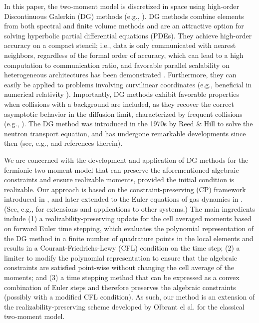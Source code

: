 In this paper, the two-moment model is discretized in space using high-order Discontinuous Galerkin (DG) methods (e.g., \cite{cockburnShu_2001,hesthavenWarburton_2008}).  
DG methods combine elements from both spectral and finite volume methods and are an attractive option for solving hyperbolic partial differential equations (PDEs).  
They achieve high-order accuracy on a compact stencil; i.e., data is only communicated with nearest neighbors, regardless of the formal order of accuracy, which can lead to a high computation to communication ratio, and favorable parallel scalability on heterogeneous architectures has been demonstrated \cite{klockner_etal_2009}.  
Furthermore, they can easily be applied to problems involving curvilinear coordinates (e.g., beneficial in numerical relativity \cite{teukolsky_2016}).  
Importantly, DG methods exhibit favorable properties when collisions with a background are included, as they recover the correct asymptotic behavior in the diffusion limit, characterized by frequent collisions (e.g., \cite{larsenMorel_1989,adams_2001,guermondKanschat_2010}).  
The DG method was introduced in the 1970s by Reed \& Hill \cite{reedHill_1973} to solve the neutron transport equation, and has undergone remarkable developments since then (see, e.g., \cite{shu_2016} and references therein).  

We are concerned with the development and application of DG methods for the fermionic two-moment model that can preserve the aforementioned algebraic constraints and ensure realizable moments, provided the initial condition is realizable.  
Our approach is based on the constraint-preserving (CP) framework introduced in \cite{zhangShu_2010a}, and later extended to the Euler equations of gas dynamics in \cite{zhangShu_2010b}.  
(See, e.g., \cite{xing_etal_2010,zhangShu_2011,olbrant_etal_2012,cheng_etal_2013,zhang_etal_2013,endeve_etal_2015,wuTang_2015} for extensions and applications to other systems.)  
The main ingredients include (1) a realizability-preserving update for the cell averaged moments based on forward Euler time stepping, which evaluates the polynomial representation of the DG method in a finite number of quadrature points in the local elements and results in a Courant-Friedrichs-Lewy (CFL) condition on the time step; (2) a limiter to modify the polynomial representation to ensure that the algebraic constraints are satisfied point-wise without changing the cell average of the moments; and (3) a time stepping method that can be expressed as a convex combination of Euler steps and therefore preserves the algebraic constraints (possibly with a modified CFL condition).  
As such, our method is an extension of the realizability-preserving scheme developed by Olbrant el al. \cite{olbrant_etal_2012} for the classical two-moment model.  

